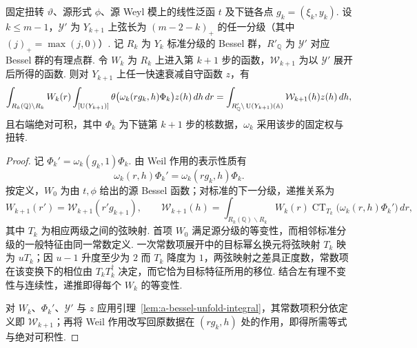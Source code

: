 \begin{lemma}[下链的单步展开]
\label{lem:a-seesaw-single-stage}
\emitthmsource
固定扭转 $\vartheta$、源形式 $\phi$、源 Weyl 模上的线性泛函 $t$ 及下链各点 $g_k=(\xi_k,y_k)$. 设 $k\le m-1$，$\mathcal Y'$ 为 $Y_{k+1}$ 上弦长为 $(m-2-k)_+$ 的任一分级（其中 $(j)_+=\max(j,0)$）. 记 $R_k$ 为 $Y_k$ 标准分级的 Bessel 群，$R'_{\mathbb Q}$ 为 $\mathcal Y'$ 对应 Bessel 群的有理点群. 令 $W_k$ 为 $R_k$ 上进入第 $k+1$ 步的函数，$\mathcal W_{k+1}$ 为以 $\mathcal Y'$ 展开后所得的函数. 则对 $Y_{k+1}$ 上任一快速衰减自守函数 $z$，有
\[
 \int_{R_k(\mathbb Q)\backslash R_k} W_k(r)
 \int_{[\operatorname{U}(Y_{k+1})]}
  \theta\bigl(\omega_k(rg_k,h)\Phi_k\bigr)z(h)\,dh\,dr
 =
 \int_{R'_{\mathbb Q}\backslash \operatorname{U}(Y_{k+1})(\mathbb A)}
    \mathcal W_{k+1}(h)z(h)\,dh ,
\]
且右端绝对可积，其中 $\Phi_k$ 为下链第 $k+1$ 步的核数据，$\omega_k$ 采用该步的固定权与扭转.
\end{lemma}
\begin{proof}
记 $\Phi_k'=\omega_k(g_k,1)\Phi_k$. 由 Weil 作用的表示性质有
\[
 \omega_k(r,h)\Phi_k'=\omega_k(rg_k,h)\Phi_k .
\]
按定义，$W_0$ 为由 $t,\phi$ 给出的源 Bessel 函数；对标准的下一分级，递推关系为
\[
 W_{k+1}(r')=\mathcal W_{k+1}(r'g_{k+1}),
 \qquad
 \mathcal W_{k+1}(h)=
 \int_{R_k(\mathbb Q)\backslash R_k}
    W_k(r)\operatorname{CT}_{T_k}\bigl(\omega_k(r,h)\Phi_k'\bigr)\,dr ,
\]
其中 $T_k$ 为相应两级之间的弦映射. 首项 $W_0$ 满足源分级的等变性，而相邻标准分级的一般特征由同一常数定义. 一次常数项展开中的目标幂幺换元将弦映射 $T_k$ 映为 $uT_k$；因 $u-1$ 升度至少为 $2$ 而 $T_k$ 降度为 $1$，两弦映射之差具正度数，常数项在该变换下的相位由 $T_kT_k^\dagger$ 决定，而它恰为目标特征所用的移位. 结合左有理不变性与连续性，递推即得每个 $W_k$ 的等变性.

对 $W_k$、$\Phi_k'$、$\mathcal Y'$ 与 $z$ 应用引理~\ref{lem:a-bessel-unfold-integral}，其常数项积分依定义即 $\mathcal W_{k+1}$；再将 Weil 作用改写回原数据在 $(rg_k,h)$ 处的作用，即得所需等式与绝对可积性.
\end{proof}

